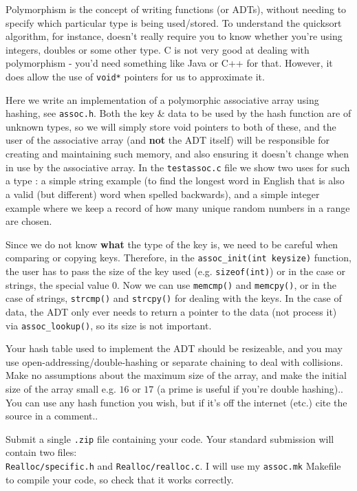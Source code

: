 
Polymorphism is the concept of writing functions (or ADTs), without
needing to specify which particular type is being used/stored. To
understand the quicksort algorithm, for instance, doesn't really require
you to know whether you're using integers, doubles or some other type. C
is not very good at dealing with polymorphism - you'd need something
like Java or C++ for that. However, it does allow the use of
\verb^void*^ pointers for us to approximate it.

\begin{exercise}
\label{ex:hahspoly}
Here we write an implementation of a polymorphic associative array using
hashing, see \verb^assoc.h^. Both the key \& data to be used by the hash
function are of
unknown types, so we will simply store void pointers to
both of these, and the user of the associative array (and {\bf not} the
ADT itself) will be responsible for creating and maintaining such memory,
and also ensuring it doesn't change when in use by the associative array.
In the \verb^testassoc.c^ file we show two uses for such a type :
a simple string example (to find the longest word in English that is
also a valid (but different) word when spelled backwards), and a simple
integer example where we keep a record of how many unique random numbers
in a range are chosen.

Since we do not know {\bf what} the type of the key is, we
need to be careful when comparing or copying keys. Therefore, in the
\verb^assoc_init(int keysize)^ function, the user has to pass the size of the
key used (e.g. \verb^sizeof(int)^) or in the case or strings, the special value $0$.
Now we can use \verb^memcmp()^ and \verb^memcpy()^, or in the case of strings, \verb^strcmp()^
and \verb^strcpy()^ for dealing with the keys. In the case of data, the ADT only ever needs
to return a pointer to the data (not process it) via
\verb^assoc_lookup()^, so its size is not important.

Your hash table used to implement the ADT should be resizeable, and you may use
open-addressing/double-hashing or separate chaining to deal with collisions. Make no assumptions about
the maximum size of the array, and make the initial size of the array small e.g. $16$ or $17$
(a prime is useful if you're double hashing)..
You can use any hash function you wish, but if it's off the internet (etc.) cite
the source in a comment..

Submit a single \verb^.zip^ file containing your code.
Your standard submission will contain two files:\\
\verb^Realloc/specific.h^ and \verb^Realloc/realloc.c^.
I will use my \verb^assoc.mk^ Makefile to compile your code,
so check that it works correctly.
\end{exercise}

